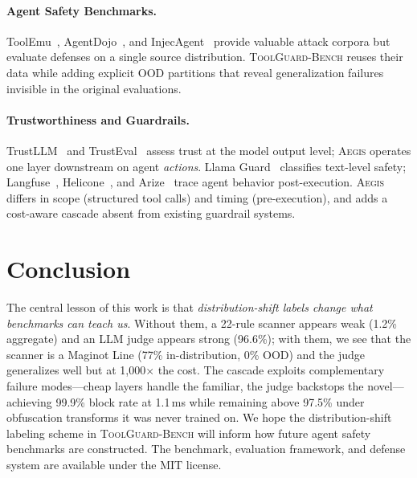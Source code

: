 \documentclass[sigconf]{acmart}
\newcommand{\system}{\textsc{Aegis}\xspace}
\newcommand{\bench}{\textsc{ToolGuard-Bench}\xspace}
\begin{document}
\paragraph{Agent Safety Benchmarks.}
ToolEmu~\cite{ruan2024toolemu}, AgentDojo~\cite{debenedetti2024agentsec}, and InjecAgent~\cite{zhan2024injecagent} provide valuable attack corpora but evaluate defenses on a single source distribution.
\bench reuses their data while adding explicit OOD partitions that reveal generalization failures invisible in the original evaluations.

\paragraph{Trustworthiness and Guardrails.}
TrustLLM~\cite{huang2024position} and TrustEval~\cite{wang2024trusteval} assess trust at the model output level; \system operates one layer downstream on agent \emph{actions}.
Llama Guard~\cite{inan2023llama} classifies text-level safety; Langfuse~\cite{langfuse2024}, Helicone~\cite{helicone2024}, and Arize~\cite{arize2024} trace agent behavior post-execution.
\system differs in scope (structured tool calls) and timing (pre-execution), and adds a cost-aware cascade absent from existing guardrail systems.

\section{Conclusion}

The central lesson of this work is that \emph{distribution-shift labels change what benchmarks can teach us}.
Without them, a 22-rule scanner appears weak (1.2\% aggregate) and an LLM judge appears strong (96.6\%); with them, we see that the scanner is a Maginot Line (77\% in-distribution, 0\% OOD) and the judge generalizes well but at 1{,}000$\times$ the cost.
The cascade exploits complementary failure modes---cheap layers handle the familiar, the judge backstops the novel---achieving 99.9\% block rate at 1.1\,ms while remaining above 97.5\% under obfuscation transforms it was never trained on.
We hope the distribution-shift labeling scheme in \bench will inform how future agent safety benchmarks are constructed.
The benchmark, evaluation framework, and defense system are available under the MIT license.

\clearpage



\clearpage
\appendix
\end{document}

